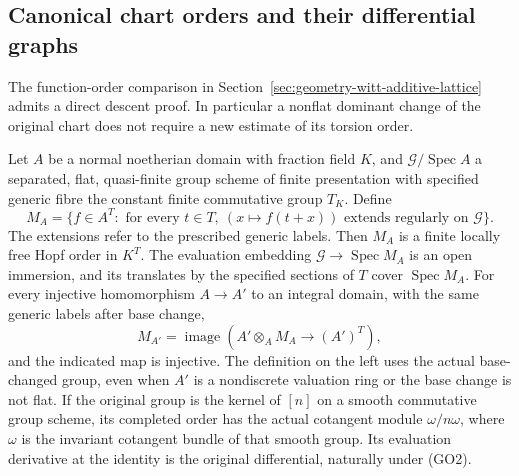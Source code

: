 \subsection{Canonical chart orders and their differential graphs}
\label{sec:geometry-global-chart-orders}

The function-order comparison in
Section~\ref{sec:geometry-witt-additive-lattice} admits a
direct descent proof. In particular a nonflat dominant
change of the original chart does not require a new
estimate of its torsion order.

\begin{theorem}
\label{thm:geometry-canonical-chart-order}
Let \(A\) be a normal noetherian domain with fraction field \(K\),
and \(\mathscr G/\operatorname{Spec}A\) a separated, flat,
quasi-finite group scheme of finite presentation with
specified generic fibre the constant finite commutative group
\(T_K\). Define
\[
 M_A=\{f\in A^T:\text{ for every }t\in T,\ 
          (x\mapsto f(t+x))\text{ extends regularly on }\mathscr G\}.
                                                               \tag{GO1}
\]
The extensions refer to the prescribed generic labels.
Then \(M_A\) is a finite locally free Hopf order in \(K^T\).
The evaluation embedding
\(\mathscr G\to\operatorname{Spec}M_A\) is an open immersion,
and its translates by the specified sections of \(T\) cover
\(\operatorname{Spec}M_A\).
For every injective homomorphism \(A\to A'\) to an integral
domain, with the same generic labels after base change,
\[
 M_{A'}=\operatorname{image}(A'\otimes_A M_A\longrightarrow (A')^T),
                                                               \tag{GO2}
\]
and the indicated map is injective. The definition on the
left uses the actual base-changed group, even when \(A'\)
is a nondiscrete valuation ring or the base change is not flat.
If the original group is the kernel of \([n]\) on a smooth
commutative group scheme, its completed order has the actual
cotangent module \(\omega/n\omega\), where \(\omega\) is the
invariant cotangent bundle of that smooth group. Its evaluation
derivative at the identity is the original differential,
naturally under (GO2).
\end{theorem}

